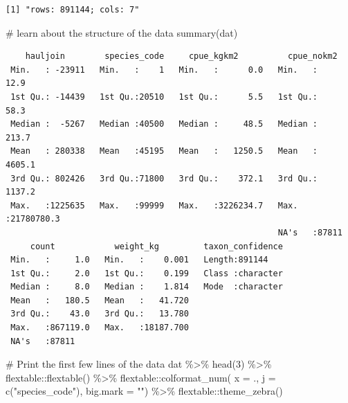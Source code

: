 \documentclass[
  letterpaper,
  oneside,
  open=any]{scrbook}
\newenvironment{Shaded}{\begin{snugshade}}{\end{snugshade}}
\newcommand{\AttributeTok}[1]{\textcolor[rgb]{0.40,0.45,0.13}{#1}}
\newcommand{\CommentTok}[1]{\textcolor[rgb]{0.37,0.37,0.37}{#1}}
\newcommand{\DecValTok}[1]{\textcolor[rgb]{0.68,0.00,0.00}{#1}}
\newcommand{\FunctionTok}[1]{\textcolor[rgb]{0.28,0.35,0.67}{#1}}
\newcommand{\NormalTok}[1]{\textcolor[rgb]{0.00,0.23,0.31}{#1}}
\newcommand{\SpecialCharTok}[1]{\textcolor[rgb]{0.37,0.37,0.37}{#1}}
\newcommand{\StringTok}[1]{\textcolor[rgb]{0.13,0.47,0.30}{#1}}
\begin{document}
\begin{verbatim}
[1] "rows: 891144; cols: 7"
\end{verbatim}

\begin{Shaded}
\begin{Highlighting}[]
\CommentTok{\# learn about the structure of the data}
\FunctionTok{summary}\NormalTok{(dat)}
\end{Highlighting}
\end{Shaded}

\begin{verbatim}
    hauljoin        species_code     cpue_kgkm2          cpue_nokm2        
 Min.   : -23911   Min.   :    1   Min.   :      0.0   Min.   :      12.9  
 1st Qu.: -14439   1st Qu.:20510   1st Qu.:      5.5   1st Qu.:      58.3  
 Median :  -5267   Median :40500   Median :     48.5   Median :     213.7  
 Mean   : 280338   Mean   :45195   Mean   :   1250.5   Mean   :    4605.1  
 3rd Qu.: 802426   3rd Qu.:71800   3rd Qu.:    372.1   3rd Qu.:    1137.2  
 Max.   :1225635   Max.   :99999   Max.   :3226234.7   Max.   :21780780.3  
                                                       NA's   :87811       
     count            weight_kg         taxon_confidence  
 Min.   :     1.0   Min.   :    0.001   Length:891144     
 1st Qu.:     2.0   1st Qu.:    0.199   Class :character  
 Median :     8.0   Median :    1.814   Mode  :character  
 Mean   :   180.5   Mean   :   41.720                     
 3rd Qu.:    43.0   3rd Qu.:   13.780                     
 Max.   :867119.0   Max.   :18187.700                     
 NA's   :87811                                            
\end{verbatim}

\begin{Shaded}
\begin{Highlighting}[]
\CommentTok{\# Print the first few lines of the data }
\NormalTok{dat }\SpecialCharTok{\%\textgreater{}\%} 
  \FunctionTok{head}\NormalTok{(}\DecValTok{3}\NormalTok{) }\SpecialCharTok{\%\textgreater{}\%} 
\NormalTok{  flextable}\SpecialCharTok{::}\FunctionTok{flextable}\NormalTok{() }\SpecialCharTok{\%\textgreater{}\%}
\NormalTok{  flextable}\SpecialCharTok{::}\FunctionTok{colformat\_num}\NormalTok{(}
      \AttributeTok{x =}\NormalTok{ ., }
      \AttributeTok{j =} \FunctionTok{c}\NormalTok{(}\StringTok{"species\_code"}\NormalTok{), }
      \AttributeTok{big.mark =} \StringTok{""}\NormalTok{) }\SpecialCharTok{\%\textgreater{}\%} 
\NormalTok{  flextable}\SpecialCharTok{::}\FunctionTok{theme\_zebra}\NormalTok{()}
\end{Highlighting}
\end{Shaded}
\end{document}
